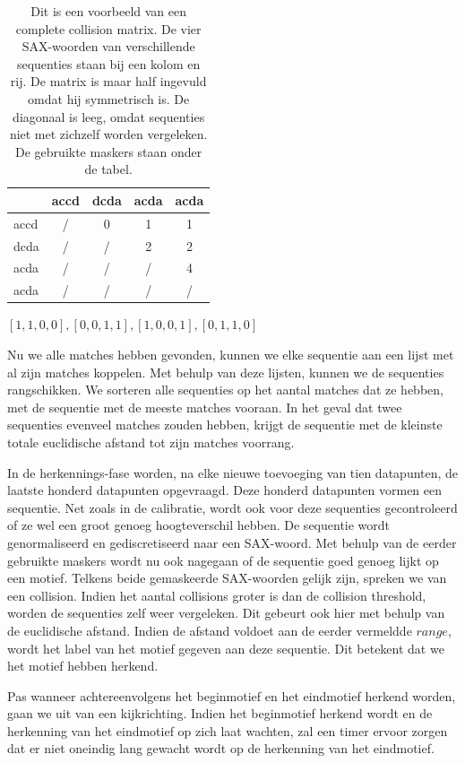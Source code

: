 \documentclass{article}
\begin{document}
\begin{table}
\caption{Dit is een voorbeeld van een complete collision matrix. De vier SAX-woorden van verschillende sequenties staan bij een kolom en rij. De matrix is maar half ingevuld omdat hij symmetrisch is.  De diagonaal is leeg, omdat sequenties niet met zichzelf worden vergeleken. De gebruikte maskers staan onder de tabel.}
\label{tab:collision_matrix}
\centering
\begin{tabular}{ l || c | c | c | c }
& accd & dcda & acda & acda \\ \hline
\hline
accd & / & 0 & 1 & 1 \\ \hline
dcda & / & / & 2 & 2 \\ \hline
acda & / & / & / & 4 \\ \hline
acda & / & / & / & / \\
\hline
\end{tabular}\par

$[1,1,0,0], [0,0,1,1], [1,0,0,1], [0,1,1,0]$
\end{table}

Nu we alle matches hebben gevonden, kunnen we elke sequentie aan een lijst met al zijn matches koppelen. Met behulp van deze lijsten, kunnen we de sequenties rangschikken. We sorteren alle sequenties op het aantal matches dat ze hebben, met de sequentie met de meeste matches vooraan. In het geval dat twee sequenties evenveel matches zouden hebben, krijgt de sequentie met de kleinste totale euclidische afstand tot zijn matches voorrang.

In de herkennings-fase worden, na elke nieuwe toevoeging van tien datapunten, de laatste honderd datapunten opgevraagd. Deze honderd datapunten vormen een sequentie. Net zoals in de calibratie, wordt ook voor deze sequenties gecontroleerd of ze wel een groot genoeg hoogteverschil hebben. De sequentie wordt genormaliseerd en gediscretiseerd naar een SAX-woord. Met behulp van de eerder gebruikte maskers wordt nu ook nagegaan of de sequentie goed genoeg lijkt op een motief. Telkens beide gemaskeerde SAX-woorden gelijk zijn, spreken we van een collision. Indien het aantal collisions groter is dan de collision threshold, worden de sequenties zelf weer vergeleken. Dit gebeurt ook hier met behulp van de euclidische afstand. Indien de afstand voldoet aan de eerder vermeldde $range$, wordt het label van het motief gegeven aan deze sequentie. Dit betekent dat we het motief hebben herkend. 

Pas wanneer achtereenvolgens het beginmotief en het eindmotief herkend worden, gaan we uit van een kijkrichting. Indien het beginmotief herkend wordt en de herkenning van het eindmotief op zich laat wachten, zal een timer ervoor zorgen dat er niet oneindig lang gewacht wordt op de herkenning van het eindmotief.
\end{document}
